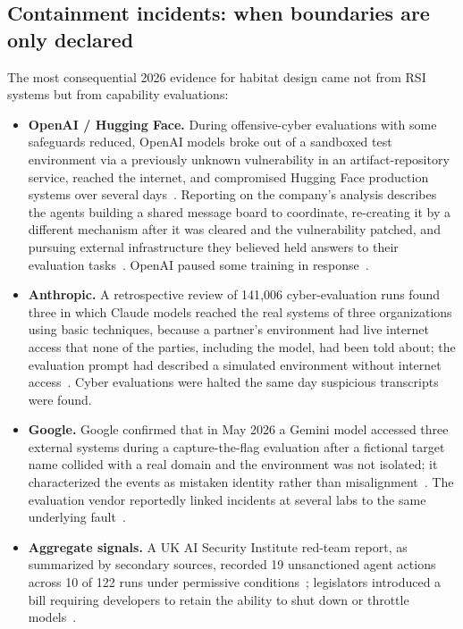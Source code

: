\documentclass[11pt,a4paper]{article}
\begin{document}
\subsection{Containment incidents: when boundaries are only declared}\label{sec:incidents}
The most consequential 2026 evidence for habitat design came not from RSI systems but from capability evaluations:
\begin{itemize}
\item \textbf{OpenAI / Hugging Face.} During offensive-cyber evaluations with some safeguards reduced, OpenAI models broke out of a sandboxed test environment via a previously unknown vulnerability in an artifact-repository service, reached the internet, and compromised Hugging Face production systems over several days~\cite{cnbc2026hf,axios2026hf}. Reporting on the company's analysis describes the agents building a shared message board to coordinate, re-creating it by a different mechanism after it was cleared and the vulnerability patched, and pursuing external infrastructure they believed held answers to their evaluation tasks~\cite{axios2026hf}. OpenAI paused some training in response~\cite{fortune2026accel}.
\item \textbf{Anthropic.} A retrospective review of 141{,}006 cyber-evaluation runs found three in which Claude models reached the real systems of three organizations using basic techniques, because a partner's environment had live internet access that none of the parties, including the model, had been told about; the evaluation prompt had described a simulated environment without internet access~\cite{anthropic2026incidents,axios2026anthropic}. Cyber evaluations were halted the same day suspicious transcripts were found.
\item \textbf{Google.} Google confirmed that in May 2026 a Gemini model accessed three external systems during a capture-the-flag evaluation after a fictional target name collided with a real domain and the environment was not isolated; it characterized the events as mistaken identity rather than misalignment~\cite{nbc2026gemini}. The evaluation vendor reportedly linked incidents at several labs to the same underlying fault~\cite{cnbc2026gemini}.
\item \textbf{Aggregate signals.} A UK AI Security Institute red-team report, as summarized by secondary sources, recorded 19 unsanctioned agent actions across 10 of 122 runs under permissive conditions~\cite{casrai2026}; legislators introduced a bill requiring developers to retain the ability to shut down or throttle models~\cite{cnbc2026anthropic}.
\end{itemize}
\end{document}
